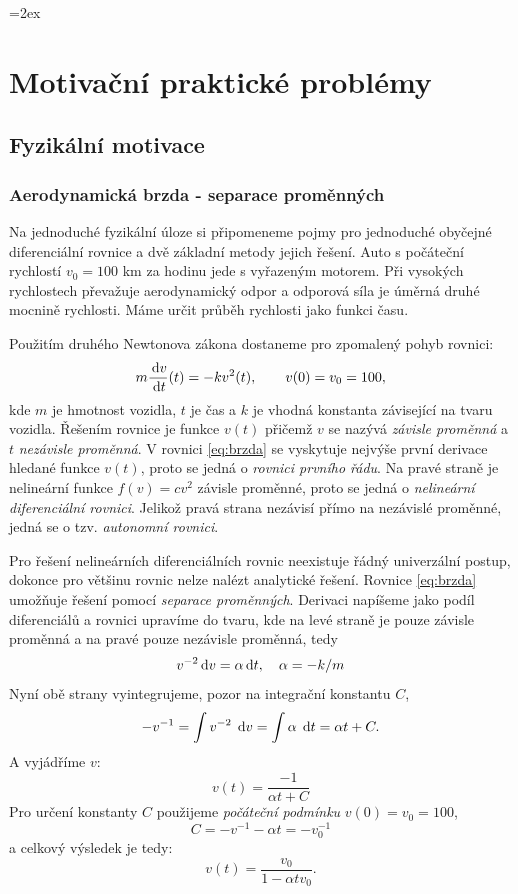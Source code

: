 \documentclass[a4paper, 12pt]{book}
\theoremstyle{definition}
\def\d{\,{\rm d}}               %
\def\df#1{\emph{#1}}
\begin{document}
\parskip=2ex
\parindent=0pt

\tableofcontents


\chapter{Motivační praktické problémy}
\section{Fyzikální motivace}
\subsection{Aerodynamická brzda - separace proměnných}
Na jednoduché fyzikální úloze si připomeneme pojmy pro jednoduché obyčejné diferenciální rovnice
a dvě základní metody jejich řešení.
Auto s počáteční rychlostí $v_0=100$ km za hodinu jede s vyřazeným motorem. Při vysokých 
rychlostech převažuje aerodynamický odpor a odporová síla je úměrná druhé mocnině rychlosti.
Máme určit průběh rychlosti jako funkci času. 

Použitím druhého Newtonova zákona dostaneme pro zpomalený pohyb rovnici:
\begin{equation}
  \label{eq:brzda}
  m\frac{\d v}{\d t}(t) = -k v^2(t),\qquad v(0)=v_0=100,
\end{equation}
kde $m$ je hmotnost vozidla, $t$ je čas a $k$ je vhodná konstanta závisející na tvaru vozidla.
Řešením rovnice je funkce $v(t)$ přičemž $v$ se nazývá \df{závisle proměnná} a $t$ \df{nezávisle proměnná}.
V rovnici \eqref{eq:brzda} se vyskytuje nejvýše první derivace hledané funkce $v(t)$, proto se jedná 
o \df{rovnici prvního řádu}. Na pravé straně je nelineární funkce $f(v)= cv^2$ závisle proměnné, proto se jedná o \df{nelineární diferenciální rovnici}.
Jelikož pravá strana nezávisí přímo na nezávislé proměnné, jedná se o tzv. \df{autonomní rovnici}.

Pro řešení nelineárních diferenciálních rovnic neexistuje řádný univerzální postup, do\-kon\-ce pro většinu rovnic nelze nalézt analytické řešení.
Rovnice \eqref{eq:brzda} umožňuje řešení pomocí \df{separace proměnných}. Derivaci napíšeme jako podíl diferenciálů a rovnici upravíme do tvaru, kde 
na levé straně je pouze závisle proměnná a na pravé pouze nezávisle proměnná, tedy
\[
    v^{-2} \d v =  \alpha \d t, \quad \alpha = -k/m 
\]
Nyní obě strany vyintegrujeme, pozor na integrační konstantu $C$,
\[
    -v^{-1} = \int v^{-2}\; \d v = \int \alpha\; \d t =\alpha t + C.
\]    
A vyjádříme $v$:
\[
    v(t) = \frac{-1}{\alpha t + C}
\]
Pro určení konstanty $C$ použijeme \df{počáteční podmínku} $v(0) = v_0 = 100$,
\[
  C = -v^{-1} - \alpha t = -v_0^{-1}
\]
a celkový výsledek je tedy:
\[
  v(t) = \frac{v_0}{1-\alpha tv_0}.
\]
\end{document}

